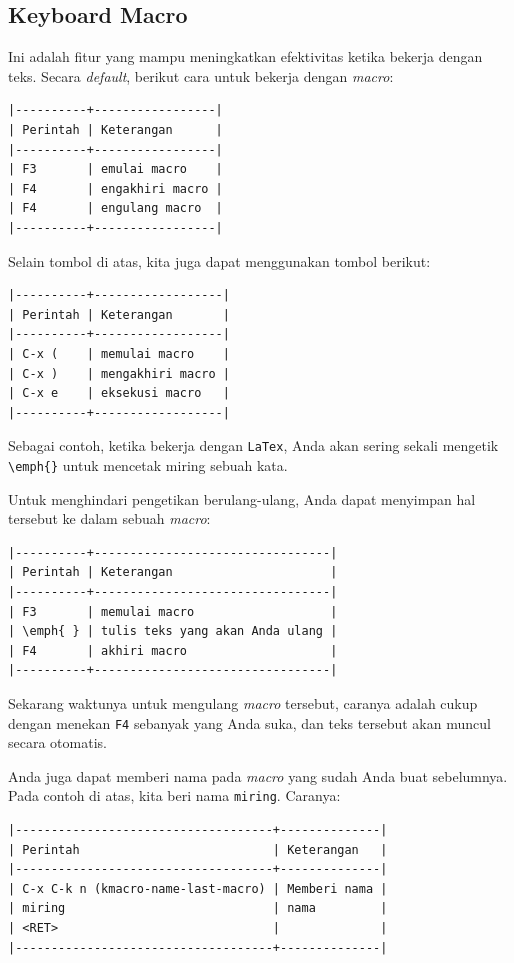 \documentclass{article}
\begin{document}
\subsection{Keyboard Macro}
Ini adalah fitur yang mampu meningkatkan efektivitas ketika bekerja dengan teks.
Secara \emph{default}, berikut cara untuk bekerja dengan \emph{macro}:

\begin{verbatim}
|----------+-----------------|
| Perintah | Keterangan      |
|----------+-----------------|
| F3       | emulai macro    |
| F4       | engakhiri macro |
| F4       | engulang macro  |
|----------+-----------------|
\end{verbatim}

Selain tombol di atas, kita juga dapat menggunakan tombol berikut:

\begin{verbatim}
|----------+------------------|
| Perintah | Keterangan       |
|----------+------------------|
| C-x (    | memulai macro    |
| C-x )    | mengakhiri macro |
| C-x e    | eksekusi macro   |
|----------+------------------|
\end{verbatim}

Sebagai contoh, ketika bekerja dengan \verb=LaTex=, Anda akan sering sekali
mengetik \verb=\emph{}= untuk mencetak miring sebuah kata.

Untuk menghindari pengetikan berulang-ulang, Anda dapat menyimpan hal tersebut 
ke dalam sebuah \emph{macro}:

\begin{verbatim}
|----------+---------------------------------|
| Perintah | Keterangan                      |
|----------+---------------------------------|
| F3       | memulai macro                   |
| \emph{ } | tulis teks yang akan Anda ulang |
| F4       | akhiri macro                    |
|----------+---------------------------------|
\end{verbatim}

Sekarang waktunya untuk mengulang \emph{macro} tersebut, caranya adalah cukup
dengan menekan \verb=F4= sebanyak yang Anda suka, dan teks tersebut akan
muncul secara otomatis.

Anda juga dapat memberi nama pada \emph{macro} yang sudah Anda buat
sebelumnya. Pada contoh di atas, kita beri nama \texttt{miring}. Caranya:

\begin{verbatim}
|------------------------------------+--------------|
| Perintah                           | Keterangan   |
|------------------------------------+--------------|
| C-x C-k n (kmacro-name-last-macro) | Memberi nama |
| miring                             | nama         |
| <RET>                              |              |
|------------------------------------+--------------|
\end{verbatim}
\end{document}
